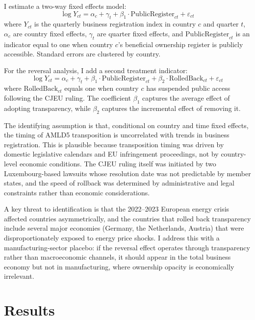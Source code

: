 \documentclass[12pt]{article}
\begin{document}
I estimate a two-way fixed effects model:
\begin{equation}
\label{eq:main}
\log Y_{ct} = \alpha_c + \gamma_t + \beta_1 \cdot \text{PublicRegister}_{ct} + \varepsilon_{ct}
\end{equation}
where $Y_{ct}$ is the quarterly business registration index in country $c$ and quarter $t$, $\alpha_c$ are country fixed effects, $\gamma_t$ are quarter fixed effects, and $\text{PublicRegister}_{ct}$ is an indicator equal to one when country $c$'s beneficial ownership register is publicly accessible. Standard errors are clustered by country.

For the reversal analysis, I add a second treatment indicator:
\begin{equation}
\label{eq:full}
\log Y_{ct} = \alpha_c + \gamma_t + \beta_1 \cdot \text{PublicRegister}_{ct} + \beta_2 \cdot \text{RolledBack}_{ct} + \varepsilon_{ct}
\end{equation}
where $\text{RolledBack}_{ct}$ equals one when country $c$ has suspended public access following the CJEU ruling. The coefficient $\beta_1$ captures the average effect of adopting transparency, while $\beta_2$ captures the incremental effect of removing it.

The identifying assumption is that, conditional on country and time fixed effects, the timing of AMLD5 transposition is uncorrelated with trends in business registration. This is plausible because transposition timing was driven by domestic legislative calendars and EU infringement proceedings, not by country-level economic conditions. The CJEU ruling itself was initiated by two Luxembourg-based lawsuits whose resolution date was not predictable by member states, and the speed of rollback was determined by administrative and legal constraints rather than economic considerations.

A key threat to identification is that the 2022--2023 European energy crisis affected countries asymmetrically, and the countries that rolled back transparency include several major economies (Germany, the Netherlands, Austria) that were disproportionately exposed to energy price shocks. I address this with a manufacturing-sector placebo: if the reversal effect operates through transparency rather than macroeconomic channels, it should appear in the total business economy but not in manufacturing, where ownership opacity is economically irrelevant.


\section{Results}
\end{document}
